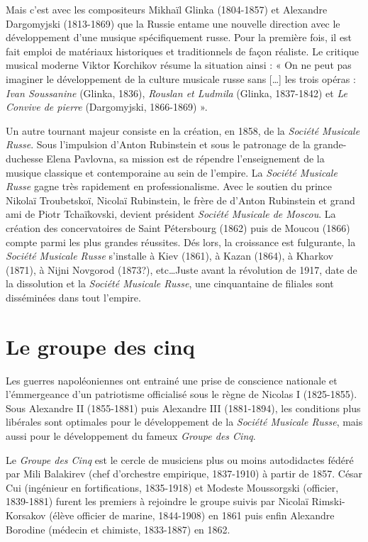 Mais c'est avec les compositeurs Mikhaïl Glinka (1804-1857) et Alexandre Dargomyjski (1813-1869) que la Russie entame une nouvelle direction avec le développement d'une musique spécifiquement russe. Pour la première fois, il est fait emploi de matériaux historiques et traditionnels de façon réaliste. Le critique musical moderne Viktor Korchikov résume la situation ainsi : « On ne peut pas imaginer le développement de la culture musicale russe sans [\ldots] les trois opéras : \emph{Ivan Soussanine} (Glinka, 1836), \emph{Rouslan et Ludmila} (Glinka, 1837-1842) et \emph{Le Convive de pierre} (Dargomyjski, 1866-1869) ».

Un autre tournant majeur consiste en la création, en 1858, de la \emph{Société Musicale Russe}. Sous l'impulsion d'Anton Rubinstein et sous le patronage de la grande-duchesse Elena Pavlovna, sa mission est de répendre l'enseignement de la musique classique et contemporaine au sein de l'empire. La \emph{Société Musicale Russe} gagne très rapidement en professionalisme. Avec le soutien du prince Nikolaï Troubetskoï, Nicolaï Rubinstein, le frère de d'Anton Rubinstein et grand ami de Piotr Tchaïkovski, devient président \emph{Société Musicale de Moscou}. La création des concervatoires de Saint Pétersbourg (1862) puis de Moucou (1866) compte parmi les plus grandes réussites. Dés lors, la croissance est fulgurante, la \emph{Société Musicale Russe} s'installe à Kiev (1861), à Kazan (1864), à Kharkov (1871), à Nijni Novgorod (1873?), etc\ldots Juste avant la révolution de 1917, date de la dissolution et la \emph{Société Musicale Russe}, une cinquantaine de filiales sont disséminées dans tout l'empire. 

\section{Le groupe des cinq}

Les guerres napoléoniennes ont entrainé une prise de conscience nationale et l'émmergeance d'un patriotisme officialisé sous le règne de Nicolas I\ier{} (1825-1855).  Sous Alexandre II (1855-1881) puis Alexandre III (1881-1894), les conditions plus libérales sont optimales pour le développement de la \emph{Société Musicale Russe}, mais aussi pour le développement du fameux \emph{Groupe des Cinq}.

Le \emph{Groupe des Cinq} est le cercle de musiciens plus ou moins autodidactes fédéré par Mili Balakirev (chef d'orchestre empirique, 1837-1910) à partir de 1857. César Cui (ingénieur en fortifications, 1835-1918) et Modeste Moussorgski (officier, 1839-1881) furent les premiers à rejoindre le groupe suivis par Nicolaï Rimski-Korsakov (élève officier de marine, 1844-1908) en 1861 puis enfin Alexandre Borodine (médecin et chimiste, 1833-1887) en 1862.

